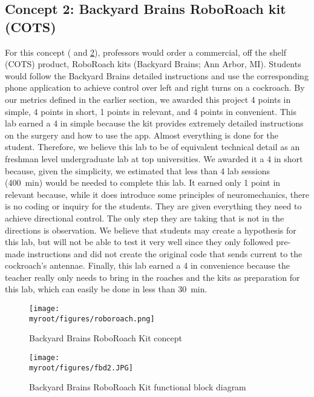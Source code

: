 \documentclass[twocolumn,10pt]{IEEEtran}
\newcommand{\myroot}{.}
\begin{document}
\subsection{Concept 2: Backyard Brains RoboRoach kit (COTS)}
For this concept ( and \ref{fig:FBD2}), professors would order a commercial, off the shelf (COTS) product, RoboRoach kits (Backyard Brains; Ann Arbor, MI). Students would follow the Backyard Brains detailed instructions and use the corresponding phone application to achieve control over left and right turns on a cockroach. By our metrics defined in the earlier section, we awarded this project 4 points in simple, 4 points in short, 1 points in relevant, and 4 points in convenient. This lab earned a 4 in simple because the kit provides extremely detailed instructions on the surgery and how to use the app. Almost everything is done for the student. Therefore, we believe this lab to be of equivalent technical detail as an freshman level undergraduate lab at top universities. We awarded it a 4 in short because, given the simplicity, we estimated that less than 4 lab sessions (\SI{400}{\minute}) would be needed to complete this lab. It earned only 1 point in relevant because, while it does introduce some principles of neuromechanics, there is no coding or inquiry for the students. They are given everything they need to achieve directional control. The only step they are taking that is not in the directions is observation. We believe that students may create a hypothesis for this lab, but will not be able to test it very well since they only followed pre-made instructions and did not create the original code that sends current to the cockroach's antennae. Finally, this lab earned a 4 in convenience because the teacher really only needs to bring in the roaches and the kits as preparation for this lab, which can easily be done in less than \SI{30}{\minute}.
\begin{figure}[ht!]
\centering
\texttt{[image: \\myroot/figures/roboroach.png]}
\caption{Backyard Brains RoboRoach Kit concept}
\label{fig:concept2}
\end{figure}
\begin{figure}[ht!]
\centering
\texttt{[image: \\myroot/figures/fbd2.JPG]}
\caption{Backyard Brains RoboRoach Kit functional block diagram}
\label{fig:FBD2}
\end{figure}
\end{document}
